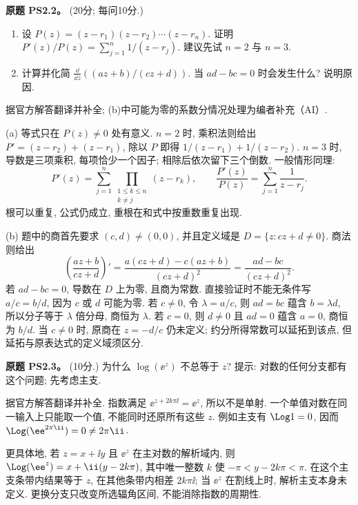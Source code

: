 \begin{exercise}\label{ass:ps2-2}
\textbf{原题 PS2.2。} (20分; 每问10分.)
\begin{enumerate}[label=(\alph*)]
\item 设 $P(z)=(z-r_1)(z-r_2)\cdots(z-r_n)$. 证明
$P'(z)/P(z)=\sum_{j=1}^n1/(z-r_j)$.
建议先试 $n=2$ 与 $n=3$.
\item 计算并化简 $\frac{\dd}{\dd z}((az+b)/(cz+d))$.
当 $ad-bc=0$ 时会发生什么? 说明原因.
\end{enumerate}
\end{exercise}
\begin{solution}
据官方解答翻译并补全; (b)中可能为零的系数分情况处理为编者补充（AI）.

(a) 等式只在 $P(z)\ne0$ 处有意义. $n=2$ 时, 乘积法则给出
$P'=(z-r_2)+(z-r_1)$, 除以 $P$ 即得 $1/(z-r_1)+1/(z-r_2)$.
$n=3$ 时, 导数是三项乘积, 每项恰少一个因子; 相除后依次留下三个倒数. 一般情形同理:
\[
 P'(z)=\sum_{j=1}^n\prod_{\substack{1\le k\le n\\k\ne j}}(z-r_k),
 \qquad
 \frac{P'(z)}{P(z)}=\sum_{j=1}^n\frac1{z-r_j}.
\]
根可以重复, 公式仍成立, 重根在和式中按重数重复出现.

(b) 题中的商首先要求 $(c,d)\ne(0,0)$, 并且定义域是
$D=\{z:cz+d\ne0\}$. 商法则给出
\[
 \left(\frac{az+b}{cz+d}\right)'
 =\frac{a(cz+d)-c(az+b)}{(cz+d)^2}
 =\frac{ad-bc}{(cz+d)^2}.
\]
若 $ad-bc=0$, 导数在 $D$ 上为零, 且商为常数. 直接验证时不能无条件写 $a/c=b/d$, 因为 $c$ 或 $d$ 可能为零.
若 $c\ne0$, 令 $\lambda=a/c$, 则 $ad=bc$ 蕴含 $b=\lambda d$, 所以分子等于 $\lambda$ 倍分母, 商恒为 $\lambda$.
若 $c=0$, 则 $d\ne0$ 且 $ad=0$ 蕴含 $a=0$, 商恒为 $b/d$.
当 $c\ne0$ 时, 原商在 $z=-d/c$ 仍未定义; 约分所得常数可以延拓到该点, 但延拓与原表达式的定义域须区分.
\end{solution}

\begin{exercise}\label{ass:ps2-3}
\textbf{原题 PS2.3。} (10分.) 为什么 $\log(\ee^z)$ 不总等于 $z$?
提示: 对数的任何分支都有这个问题; 先考虑主支.
\end{exercise}
\begin{solution}
据官方解答翻译并补全. 指数满足 $\ee^{z+2k\pi\ii}=\ee^z$, 所以不是单射. 一个单值对数在同一输入上只能取一个值, 不能同时还原所有这些 $z$.
例如主支有 $\Log1=0$, 因而 $\Log(\ee^{2\pi\ii})=0\ne2\pi\ii$.

更具体地, 若 $z=x+\ii y$ 且 $\ee^z$ 在主对数的解析域内, 则
$\Log(\ee^z)=x+\ii(y-2k\pi)$, 其中唯一整数 $k$ 使 $-\pi<y-2k\pi<\pi$. 在这个主支条带内结果等于 $z$, 在其他条带内相差 $2k\pi\ii$; 当 $\ee^z$ 在割线上时, 解析主支本身未定义. 更换分支只改变所选辐角区间, 不能消除指数的周期性.
\end{solution}

